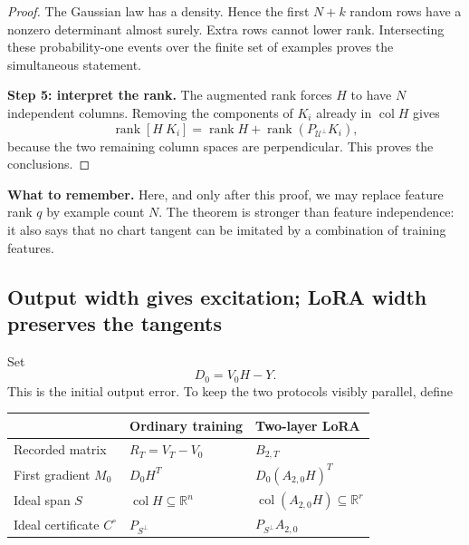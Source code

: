 \documentclass[12pt,a4paper]{article}
\theoremstyle{readable}
\theoremstyle{definition}\newtheorem{example}[theorem]{Example}
\newcommand{\R}{\mathbb R}\newcommand{\rank}{\operatorname{rank}}
\newcommand{\col}{\operatorname{col}}\newcommand{\row}{\operatorname{row}}
\newcommand{\takeaway}[1]{\par\textbf{What to remember.} #1\par}
\begin{document}
\begin{proof}
The Gaussian law has a density. Hence the first \(N+k\) random rows have a nonzero determinant almost surely. Extra rows cannot lower rank. Intersecting these probability-one events over the finite set of examples proves the simultaneous statement.

\textbf{Step 5: interpret the rank.} The augmented rank forces \(H\) to have \(N\) independent columns. Removing the components of \(K_i\) already in \(\col H\) gives
\[
\rank[H\ K_i]=\rank H+\rank(P_{\mathcal U^\perp}K_i),
\]
because the two remaining column spaces are perpendicular. This proves the conclusions.
\end{proof}
\takeaway{Here, and only after this proof, we may replace feature rank \(q\) by example count \(N\). The theorem is stronger than feature independence: it also says that no chart tangent can be imitated by a combination of training features.}

\subsection{Output width gives excitation; LoRA width preserves the tangents}
Set
\[
D_0=V_0H-Y.
\]
This is the initial output error. To keep the two protocols visibly parallel, define
\begin{center}
\begin{tabular}{@{}>{\raggedright\arraybackslash}p{25mm}>{\raggedright\arraybackslash}p{54mm}>{\raggedright\arraybackslash}p{62mm}@{}}
\toprule & Ordinary training & Two-layer LoRA\\\midrule
Recorded matrix & \(R_T=V_T-V_0\) & \(B_{2,T}\)\\
First gradient \(M_0\) & \(D_0H^T\) & \(D_0(A_{2,0}H)^T\)\\
Ideal span \(S\) & \(\col H\subseteq\R^n\) & \(\col(A_{2,0}H)\subseteq\R^r\)\\
Ideal certificate \(C^\circ\) & \(P_{S^\perp}\) & \(P_{S^\perp}A_{2,0}\)\\\bottomrule
\end{tabular}
\end{center}
\end{document}
